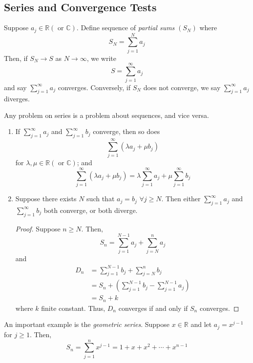 \documentclass[10pt, a4paper, twoside]{report}
\begin{document}
\subsection{Series and Convergence Tests}
\begin{definition}
    Suppose \(a_j\in\mathbb{R}(\text{ or }\mathbb{C})\). Define sequence of \emph{partial sums} \((S_N)\) where
    \[S_N=\sum_{j=1}^N a_j\]
    Then, if \(S_N\to S\) as \(N\to\infty\), we write
    \[S=\sum_{j=1}^\infty a_j\]
    and say \(\sum_{j=1}^\infty a_j\) converges. Conversely, if \(S_N\) does not converge, we say \(\sum_{j=1}^\infty a_j\) diverges.
\end{definition}
\begin{remark}
    Any problem on series is a problem about sequences, and vice versa.
\end{remark}
\begin{lemma} \item[]
    \begin{enumerate}
        \item If \(\sum_{j=1}^\infty a_j\) and \(\sum_{j=1}^\infty b_j\) converge, then so does 
        \[\sum_{j=1}^\infty(\lambda a_j+\mu b_j)\]
        for \(\lambda, \mu\in\mathbb{R}(\text{ or }\mathbb{C})\); and 
        \[\sum_{j=1}^\infty(\lambda a_j+\mu b_j)=\lambda\sum_{j=1}^\infty a_j+\mu\sum_{j=1}^\infty b_j\]
        \item Suppose there exists \(N\) such that \(a_j=b_j\) \(\forall j\geq N\). Then either \(\sum_{j=1}^\infty a_j\) and \(\sum_{j=1}^\infty b_j\) both converge, or both diverge.
        \begin{proof}
            Suppose \(n\geq N\). Then,
            \[S_n=\sum_{j=1}^{N-1} a_j+\sum_{j=N}^n a_j\]
            and
            \begin{align*}
                D_n&=\sum_{j=1}^{N-1} b_j+\sum_{j=N}^n b_j \\
                &=S_n+\left(\sum_{j=1}^{N-1}b_j-\sum_{j=1}^{N-1}a_j\right) \\
                &=S_n+k
            \end{align*}
            where \(k\) finite constant. Thus, \(D_n\) converges if and only if \(S_n\) converges.
        \end{proof}
    \end{enumerate}
    \label{lemma:series}
\end{lemma}
An important example is the \emph{geometric series}. Suppose \(x\in\mathbb{R}\) and let \(a_j=x^{j-1}\) for \(j\geq 1\). Then,
\[S_n=\sum_{j=1}^{n}x^{j-1}=1+x+x^2+\cdots+x^{n-1}\]
\end{document}
